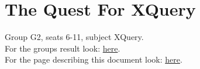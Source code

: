 %
%

\chapter{The Quest For XQuery}
Group G2, seats 6-11, subject XQuery.\\
For the groups result look: \href{https://www.os3.nl/2015-2016/students/jeroen_van_prooijen/es/week36/g2_exercise_xquery}{here}.\\
For the page describing this document look: \href{https://www.os3.nl/2015-2016/students/jeroen_van_prooijen/es/week36#group_assignmentxquery}{here}.\\

